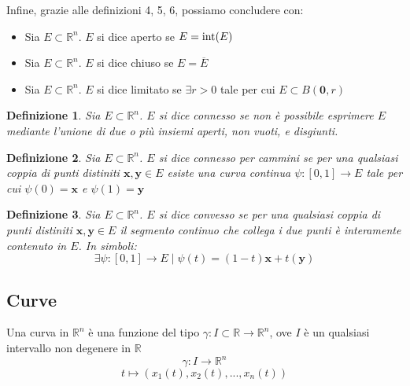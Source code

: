 \documentclass{article}
\newtheorem{definition}{Definizione}
\begin{document}
        Infine, grazie alle definizioni 4, 5, 6, possiamo concludere con:
        \begin{itemize}
            \item Sia $E \subset \mathbb{R}^{n}$. $E$ si dice aperto se $E = \textnormal{int}(E)$
            \item Sia $E \subset \mathbb{R}^{n}$. $E$ si dice chiuso se $E = \overline{E}$
            \item Sia $E \subset \mathbb{R}^{n}$. $E$ si dice limitato se $\exists r > 0$ tale per cui $E \subset B(\mathbf{0}, r)$
        \end{itemize}

        \begin{definition}
            Sia $E \subset \mathbb{R}^{n}$. $E$ si dice connesso se non è possibile esprimere $E$ mediante l'unione di due o più insiemi aperti, non vuoti, e disgiunti. 
        \end{definition}

        \begin{definition}
            Sia $E \subset \mathbb{R}^{n}$. $E$ si dice connesso per cammini se per una qualsiasi coppia di punti distiniti $\mathbf{x}, \mathbf{y} \in E$ esiste una curva continua $\psi: [0, 1] \rightarrow E$ tale per cui $\psi(0) = \mathbf{x}$ e $\psi(1) = \mathbf{y}$
        \end{definition}

        \begin{definition}
            Sia $E \subset \mathbb{R}^{n}$. $E$ si dice convesso se per una qualsiasi coppia di punti distiniti $\mathbf{x}, \mathbf{y} \in E$ il segmento continuo che collega i due punti è interamente contenuto in $E$. In simboli:
            \[
                \exists \psi: [0, 1] \rightarrow E \; | \; \psi(t) = (1-t)\mathbf{x} + t(\mathbf{y})
            \]
        \end{definition}

    \subsection{Curve}
        Una curva in $\mathbb{R}^{n}$ è una funzione del tipo $\gamma: I \subset \mathbb{R} \rightarrow \mathbb{R}^{n}$, ove $I$ è un qualsiasi intervallo non degenere in $\mathbb{R}$
        \[
            \gamma: I \rightarrow \mathbb{R}^{n}
        \]
        \[
            t \mapsto (x_1(t), x_2(t), ..., x_n(t))
        \]
\end{document}
